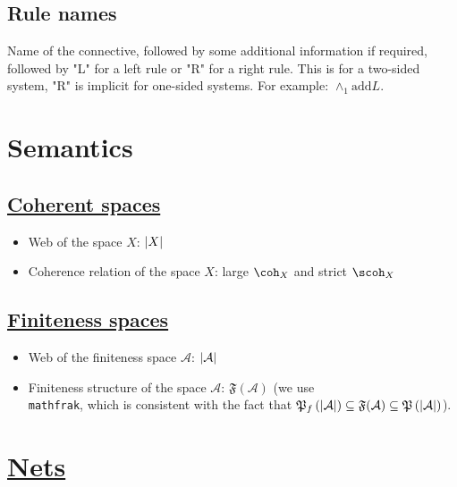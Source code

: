 \subsection{Rule names}\label{rule-names}

Name of the connective, followed by some additional information if
required, followed by "L" for a left rule or "R" for a right rule. This
is for a two-sided system, "R" is implicit for one-sided systems. For
example: $\wedge_1
\text{add} L$.

\section{Semantics}

\subsection{\texorpdfstring{\hyperref[coherent-semantics]{Coherent spaces}}{Coherent spaces}}\label{coherent-spaces}

\begin{itemize}
\item Web of the space $X$: $\left|X\right|$
\item Coherence relation of the space $X$: large $\coh_X$ and strict $\scoh_X$
\end{itemize}

\subsection{\texorpdfstring{\hyperref[finiteness-semantics]{Finiteness spaces}}{Finiteness spaces}}\label{finiteness-spaces}

\begin{itemize}
\item
  Web of the finiteness space
  $\mathcal
  A$:
  $\left|\mathcal
  A\right|$
\item
  Finiteness structure of the space
  $\mathcal
  A$:
  $\mathfrak
  F(\mathcal A)$ (we use
  \texttt{\\mathfrak},
  which is consistent with the fact that
  $\mathfrak{P}_f\left(\left|\mathcal
  A\right|\right)\subseteq \mathfrak
  F(\mathcal A)
  \subseteq\mathfrak{P}\left(\left|\mathcal
  A\right|\right)$).
\end{itemize}

\section{\texorpdfstring{\hyperref[nets]{Nets}}{Nets}}


